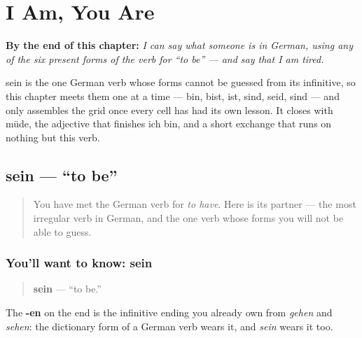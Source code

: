 
\chapter{I Am, You Are}
\label{ch:sein}

\begin{chapteropening}
\textbf{By the end of this chapter:} \emph{I can say what someone is in German, using any of the six present forms of the verb for “to be” — and say that I am tired.}

sein is the one German verb whose forms cannot be guessed from its infinitive, so this chapter meets them one at a time — bin, bist, ist, sind, seid, sind — and only assembles the grid once every cell has had its own lesson. It closes with müde, the adjective that finishes ich bin, and a short exchange that runs on nothing but this verb.
\end{chapteropening}

\section[sein]{sein — \textquotedblleft{}to be\textquotedblright{}}

\label{lesson:GE-C16-sein}



\begin{quote}
You have met the German verb for \emph{to have}. Here is its partner — the most irregular verb in German, and the one verb whose forms you will not be able to guess.
\end{quote}

\subsection*{You'll want to know: sein}
\begin{quote}
\textbf{sein} — \textquotedblleft{}to be.\textquotedblright{}
\end{quote}

The \textbf{-en} on the end is the infinitive ending you already own from \emph{gehen} and \emph{sehen}: the dictionary form of a German verb wears it, and \emph{sein} wears it too.

